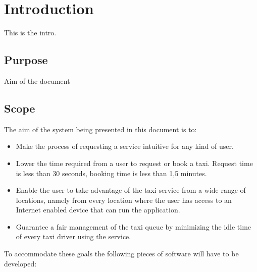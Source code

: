 \documentclass[12pt]{article}
\begin{document}
\section{Introduction}

This is the intro.


\subsection{Purpose}

Aim of the document 

\subsection{Scope}

The aim of the system being presented in this document is to:
\begin{itemize}
\item Make the process of requesting a service intuitive for any kind of user.
\item Lower the time required from a user to request or book a taxi. Request time is less than 30 seconds, booking time is less than 1,5 minutes.
\item Enable the user to take advantage of the taxi service from a wide range of locations, namely from every location where the user has access to an Internet enabled device that can run the application.
\item Guarantee a fair management of the taxi queue by minimizing the idle time of every taxi driver using the service.
\end{itemize}
To accommodate these goals the following pieces of software will have to be developed:
\end{document}
